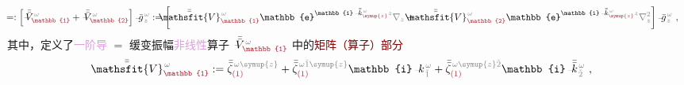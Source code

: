 \begin{subequations}
\begin{align}
	\!\!\! &=: \left[ \Xint{\mathcolor{gray}{-}}{25}{\bar{\bar{V}}}^{\;\! \mathcolor{gray}{\omega}}_{\textcolor{Maroon}{\mathbb{1}}} + \Xint{\mathcolor{gray}{-}}{25}{\bar{\bar{V}}}^{\;\! \mathcolor{gray}{\omega}}_{\textcolor{Maroon}{\mathbb{2}}} \right] \Xint{{}^{}_{\mathcolor{gray}{-}}}{10}{\bar{g}}^{\;\!\mathcolor{gray}{\omega}}_{\;\! \mathcolor{gray}{z}} := \left[ \Xint{\mathcolor{gray}{-}}{25}{\bar{\bar{\mathsfit{V}}}}^{\;\! \mathcolor{gray}{\omega}}_{\textcolor{Maroon}{\mathbb{1}}} \mathbb{e}^{\mathbb{i} \Xint{\begin{smallmatrix} ~ \\ {}^{}_{\mathcolor{gray}{-}} \\ ~ \end{smallmatrix}}{15}{\bar{\bar{k}}}_{\textcolor{Maroon}{\symup{z}}}^{\;\! \mathcolor{gray}{\omega}} \mathcolor{gray}{z}} \mathcolor{gray}{\nabla_z} + \Xint{\mathcolor{gray}{-}}{25}{\bar{\bar{\mathsfit{V}}}}^{\;\! \mathcolor{gray}{\omega}}_{\textcolor{Maroon}{\mathbb{2}}} \mathbb{e}^{\mathbb{i} \Xint{\begin{smallmatrix} ~ \\ {}^{}_{\mathcolor{gray}{-}} \\ ~ \end{smallmatrix}}{15}{\bar{\bar{k}}}_{\textcolor{Maroon}{\symup{z}}}^{\;\! \mathcolor{gray}{\omega}} \mathcolor{gray}{z}} \mathcolor{gray}{\nabla_z^2} \right] \Xint{{}^{}_{\mathcolor{gray}{-}}}{10}{\bar{g}}^{\;\!\mathcolor{gray}{\omega}}_{\;\! \mathcolor{gray}{z}} ~, \label{eq:matrix_exp_eq-left_V-1st2nd-decompose}
\end{align}
\end{subequations}
其中，定义了\textcolor{Plum}{一阶导} $=$ \textcolor{NavyBlue}{缓变振幅}\textcolor{Plum}{非线性}算子 $\Xint{\mathcolor{gray}{-}}{21}{\bar{\bar{V}}}^{\;\! \mathcolor{gray}{\omega}}_{\textcolor{Maroon}{\mathbb{1}}}$ 中的\textcolor{Maroon}{矩阵（算子）部分}
\begin{align} \label{eq:matrix_exp-V1}
	\Xint{\mathcolor{gray}{-}}{25}{\bar{\bar{\mathsfit{V}}}}^{\;\! \mathcolor{gray}{\omega}}_{\textcolor{Maroon}{\mathbb{1}}} := \bar{\bar{\zeta}}^{\;\! \mathcolor{gray}{\omega} \mathcolor{gray}{\symup{z}}}_{\textcolor{Maroon}{(1)}} + \bar{\bar{\zeta}}^{\;\! \mathcolor{gray}{\omega} \mathcolor{gray}{\check{1} \symup{z}}}_{\textcolor{Maroon}{(1)}} \mathbb{i} \Xint{\begin{smallmatrix} ~ \\ {}^{}_{\mathcolor{gray}{-}} \\ ~ \end{smallmatrix}}{15}{k}_{\;\! \mathcolor{gray}{\check{1}}}^{\;\! \mathcolor{gray}{\omega}} + \bar{\bar{\zeta}}^{\;\! \mathcolor{gray}{\omega} \mathcolor{gray}{\symup{z} \check{2}}}_{\textcolor{Maroon}{(1)}} \mathbb{i} \Xint{\begin{smallmatrix} ~ \\ {}^{}_{\mathcolor{gray}{-}} \\ ~ \end{smallmatrix}}{15}{\bar{\bar{k}}}_{\;\! \mathcolor{gray}{\check{2}}}^{\;\! \mathcolor{gray}{\omega}} ~, 
\end{align}
